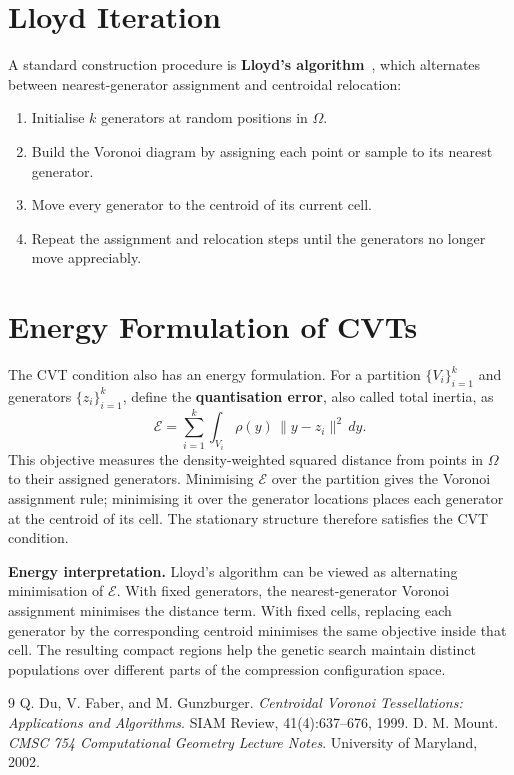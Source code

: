 \documentclass[10pt,twocolumn]{article}
\begin{document}
\section{Lloyd Iteration}
A standard construction procedure is \textbf{Lloyd's algorithm}~\cite{du1999cvt}, which alternates between nearest-generator assignment and centroidal relocation:
\begin{enumerate}[leftmargin=1.15em,itemsep=0pt,topsep=1pt]
\item Initialise $k$ generators at random positions in $\Omega$.
\item Build the Voronoi diagram by assigning each point or sample to its nearest generator.
\item Move every generator to the centroid of its current cell.
\item Repeat the assignment and relocation steps until the generators no longer move appreciably.
\end{enumerate}

\section{Energy Formulation of CVTs}
The CVT condition also has an energy formulation. For a partition $\{V_i\}_{i=1}^k$ and generators $\{z_i\}_{i=1}^k$, define the \textbf{quantisation error}, also called total inertia, as~\cite{du1999cvt}
\[
 \mathcal{E}=\sum_{i=1}^{k}\int_{V_i}\rho(y)\,\lVert y-z_i\rVert^2\,dy.
\]
This objective measures the density-weighted squared distance from points in $\Omega$ to their assigned generators. Minimising $\mathcal{E}$ over the partition gives the Voronoi assignment rule; minimising it over the generator locations places each generator at the centroid of its cell. The stationary structure therefore satisfies the CVT condition.

\begin{tcolorbox}[cvtbox]
\textbf{Energy interpretation.} Lloyd's algorithm can be viewed as alternating minimisation of $\mathcal{E}$. With fixed generators, the nearest-generator Voronoi assignment minimises the distance term. With fixed cells, replacing each generator by the corresponding centroid minimises the same objective inside that cell. The resulting compact regions help the genetic search maintain distinct populations over different parts of the compression configuration space.
\end{tcolorbox}

\begingroup\scriptsize
\setlength{\itemsep}{0pt}
\setlength{\parskip}{0pt}
\begin{thebibliography}{9}
Q. Du, V. Faber, and M. Gunzburger. \textit{Centroidal Voronoi Tessellations: Applications and Algorithms}. SIAM Review, 41(4):637--676, 1999.
D. M. Mount. \textit{CMSC 754 Computational Geometry Lecture Notes}. University of Maryland, 2002.
\end{thebibliography}
\endgroup
\end{document}
